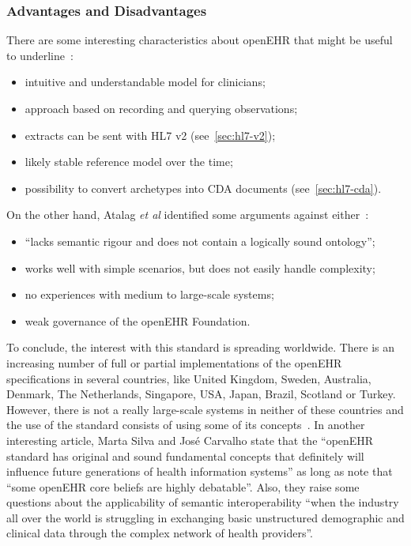 \subsubsection{Advantages and Disadvantages}

There are some interesting characteristics about openEHR that might be useful to underline~\citep{Atalag2010}:
\begin{itemize}
\item intuitive and understandable model for clinicians;
\item approach based on recording and querying observations;
\item extracts can be sent with HL7 v2 (see~\ref{sec:hl7-v2});
\item likely stable reference model	over the time;
\item possibility to convert archetypes into CDA documents (see~\ref{sec:hl7-cda}).
\end{itemize}

On the other hand, Atalag \textit{et al} identified some arguments against either~\citep{Atalag2010}:
\begin{itemize}
\item ``lacks semantic rigour and does not contain a logically sound ontology'';
\item works well with simple scenarios, but does not easily handle complexity;
\item no experiences with medium to large-scale systems;
\item weak governance of the openEHR Foundation.
\end{itemize}

To conclude, the interest with this standard is spreading worldwide. There is an increasing number of full or partial implementations of the openEHR specifications in several countries, like United Kingdom, Sweden, Australia, Denmark, The Netherlands, Singapore, USA, Japan, Brazil, Scotland or Turkey. However, there is not a really large-scale systems in neither of these countries and the use of the standard consists of using some of its concepts~\citep{Atalag2010}. In another interesting article, Marta Silva and José Carvalho state that the ``openEHR standard has original and sound fundamental
concepts that definitely will influence future generations of health information systems'' as long as note that ``some openEHR core beliefs are highly debatable''. Also, they raise some questions about the applicability of semantic interoperability ``when the industry all over the world is struggling in exchanging basic unstructured demographic and clinical data through the complex network of health providers''.~\citep{SilvaMarta;Carvalho2011}




